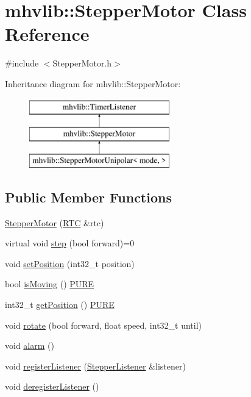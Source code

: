 \hypertarget{classmhvlib_1_1_stepper_motor}{\section{mhvlib\-:\-:Stepper\-Motor Class Reference}
\label{classmhvlib_1_1_stepper_motor}
}


{\ttfamily \#include $<$Stepper\-Motor.\-h$>$}

Inheritance diagram for mhvlib\-:\-:Stepper\-Motor\-:\begin{figure}[H]
\begin{center}
\leavevmode
\includegraphics[height=3.000000cm]{classmhvlib_1_1_stepper_motor}
\end{center}
\end{figure}
\subsection*{Public Member Functions}
\begin{DoxyCompactItemize}
\item 
\hyperlink{classmhvlib_1_1_stepper_motor_a0e3d6db71f4dcce4da4e6fd0393b7770}{Stepper\-Motor} (\hyperlink{classmhvlib_1_1_r_t_c}{R\-T\-C} \&rtc)
\item 
virtual void \hyperlink{classmhvlib_1_1_stepper_motor_a4080d4c0080a3552f71240b16ca991a1}{step} (bool forward)=0
\item 
void \hyperlink{classmhvlib_1_1_stepper_motor_a420ecfc2f3c6cce0e82e3d317d0c9203}{set\-Position} (int32\-\_\-t position)
\item 
bool \hyperlink{classmhvlib_1_1_stepper_motor_ae9ddea6662d2aae48d704e41f3db82d5}{is\-Moving} () \hyperlink{io_8h_acd42770aecb025cfac170d4d3ace4544}{P\-U\-R\-E}
\item 
int32\-\_\-t \hyperlink{classmhvlib_1_1_stepper_motor_ab72371b40067139e95853a7d9626a242}{get\-Position} () \hyperlink{io_8h_acd42770aecb025cfac170d4d3ace4544}{P\-U\-R\-E}
\item 
void \hyperlink{classmhvlib_1_1_stepper_motor_ac2087f4ee7c4c325daf3191399b917a7}{rotate} (bool forward, float speed, int32\-\_\-t until)
\item 
void \hyperlink{classmhvlib_1_1_stepper_motor_afa416867810430cda255d05716982a9d}{alarm} ()
\item 
void \hyperlink{classmhvlib_1_1_stepper_motor_ac4cb09f38b24ac71b8b8322eeb8772ff}{register\-Listener} (\hyperlink{classmhvlib_1_1_stepper_listener}{Stepper\-Listener} \&listener)
\item 
void \hyperlink{classmhvlib_1_1_stepper_motor_a0532cc0e238fa305ecb8b90216793179}{deregister\-Listener} ()
\end{DoxyCompactItemize}


